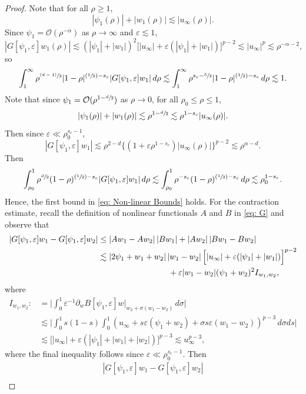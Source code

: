 \documentclass[10pt]{amsart}
\newcommand{\Psfrac}[2]{(\sfrac{#1}{#2})}
\newcommand{\psfrac}[2]{\sfrac{(#1)}{#2}}
\theoremstyle{plain}
\theoremstyle{definition}
\begin{document}
\begin{proof}
Note that for all $\rho\ge1$,
\[
|\psi_1(\rho)|+|w_1(\rho)|\lesssim |u_\infty(\rho)|.
\]
Since $\psi_1=\mathcal O( \rho^{-\alpha})$ as $\rho\to\infty$ and $\varepsilon\lesssim 1$,
\[
|G[\psi_1,\varepsilon]w_1(\rho)|\lesssim (|\psi_1|+|w_1|)^2\Big[|u_\infty|+\varepsilon (|\psi_1|+|w_1|)\Big]^{p-2}\lesssim |u_\infty|^p\lesssim \rho^{-\alpha-2},
\]
so
\[
\int_1^\infty \rho^{\psfrac{d-1}{2}}|1-\rho|^{\Psfrac{1}{2}-s_c}|G[\psi_1,\varepsilon]w_1|\,d\rho\lesssim \int_1^\infty \rho^{s_c-\sfrac{5}{2}}|1-\rho|^{\Psfrac{1}{2}-s_c}\,d\rho\lesssim1.
\]
Note that since $\psi_1=\mathcal O(\rho^{1-\sfrac{d}{2}})$ as $\rho\to0$, for all $\rho_0\le\rho\le 1$,
\[
|\psi_1(\rho)|+|w_1(\rho)|\lesssim \rho^{1-\sfrac{d}{2}}\lesssim \rho^{1-s_c}|u_\infty(\rho)|.
\]
Then since $\varepsilon\ll\rho_0^{s_c-1}$,
\[
|G[\psi_1,\varepsilon]w_1|\lesssim \rho^{2-d}\{(1+\varepsilon \rho^{1-s_c})|u_\infty(\rho)|\}^{p-2}\lesssim \rho^{\alpha-d}.
\]
Then
\[
\int_{\rho_0}^1 \rho^{\sfrac{d}{2}}(1-\rho)^{\Psfrac{1}{2}-s_c}|G[\psi_1,\varepsilon]w_1|\, d\rho\lesssim \int_{\rho_0}^1 \rho^{-s_c}(1-\rho)^{\Psfrac{1}{2}-s_c}\,d\rho\lesssim\rho_0^{1-s_c}.
\]
Hence, the first bound in \eqref{eq: Non-linear Bounds} holds. For the contraction estimate, recall the definition of nonlinear functionals $A$ and $B$ in \eqref{eq: G} and observe that
\[
\begin{aligned}
|G[\psi_1,\varepsilon]w_1-G[\psi_1,\varepsilon]w_2| &\le|Aw_1-Aw_2|\,|Bw_1|+|Aw_2|\, |Bw_1-Bw_2|\\
&\lesssim|2\psi_1+w_1+w_2|\, |w_1-w_2|\,\Big[|u_\infty|+\varepsilon (|\psi_1|+|w_1|)\Big]^{p-2}\\
&\hspace*{3cm}+\varepsilon|w_1-w_2|(\psi_1+w_2)^2 I_{w_1,w_2},
\end{aligned}
\]
where
\[
\begin{aligned}
I_{w_1,w_2}:&=\bigg|\int_0^1\varepsilon^{-1}\partial_w B[\psi_1,\varepsilon]w\Big|_{w_2+\sigma(w_1-w_2)}\,d\sigma\bigg|\\
&\lesssim\bigg|\int_0^1s(1-s)\int_0^1(u_\infty+s\varepsilon (\psi_1+w_2)+\sigma s\varepsilon (w_1-w_2))^{p-3}\,d\sigma ds\bigg|\\
&\lesssim \Big[|u_\infty|+\varepsilon (|\psi_1|+|w_1|+|w_2|)\Big]^{p-3} \lesssim u_\infty^{p-3},
\end{aligned}
\]
where the final inequality follows since $\varepsilon\ll\rho_0^{s_c-1}$. Then
\begin{multline*}
|G[\psi_1,\varepsilon]w_1-G[\psi_1,\varepsilon]w_2|\\

\end{multline*}
\end{proof}
\end{document}
